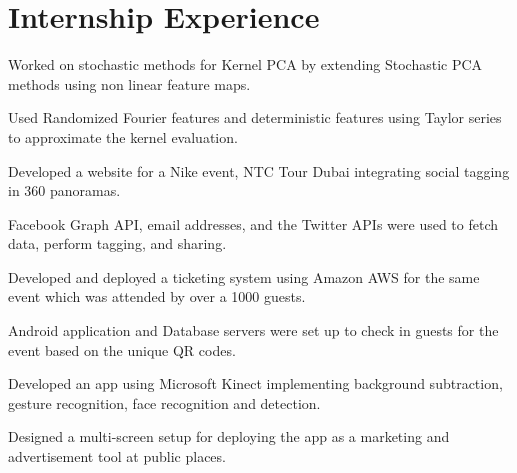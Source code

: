 \documentclass[US paper]{deedy-resume} %
\begin{document}
\section{Internship Experience}
\vspace{-4pt}
{
\begin{tightitemize}
\item Worked on stochastic methods for Kernel PCA by extending Stochastic PCA methods using non linear feature maps.
\item Used Randomized Fourier features and deterministic features using Taylor series to approximate the kernel evaluation.
\end{tightitemize}

\vspace{1mm}

\begin{tightitemize}
\item Developed a website for a Nike event, NTC Tour Dubai integrating social tagging in 360 panoramas.
\item Facebook Graph API, email addresses, and the Twitter APIs were used to fetch data, perform tagging, and sharing.
\item Developed and deployed a ticketing system using Amazon AWS for the same event which was attended by over a 1000 guests.
\item Android application and Database servers were set up to check in guests for the event based on the unique QR codes.
\end{tightitemize}

\vspace{1mm}




\begin{tightitemize}
\item Developed an app using Microsoft Kinect implementing background subtraction, gesture recognition, face recognition and detection.
\item Designed a multi-screen setup for deploying the app as a marketing and advertisement tool at public places.
\end{tightitemize}



}
\end{document}
